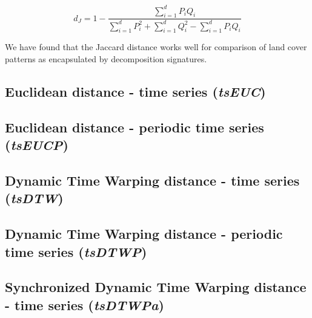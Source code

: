 \begin{equation} \label{eq:Jaccard}
d_J= 1-\dfrac
{\sum\limits_{i=1}^{d} P_i Q_i}
{\sum\limits_{i=1}^{d} P_i^2 + \sum\limits_{i=1}^{d} Q_i^2 - \sum\limits_{i=1}^{d} P_i Q_i}
\end{equation}

\noindent We have found that the Jaccard distance works well for comparison of land cover patterns as encapsulated by decomposition signatures.





\subsection{Euclidean distance - time series ({\it tsEUC})}

\subsection{Euclidean distance - periodic time series ({\it tsEUCP})}

\subsection{Dynamic Time Warping distance - time series ({\it tsDTW})}

\subsection{Dynamic Time Warping distance - periodic time series ({\it tsDTWP})}

\subsection{Synchronized Dynamic Time Warping distance - time series ({\it tsDTWPa})}

\newpage